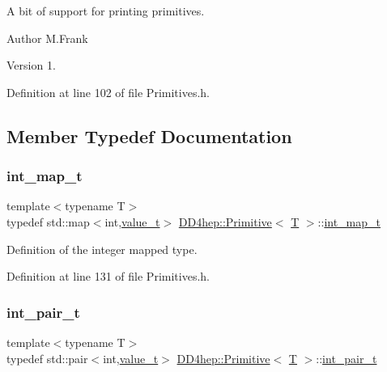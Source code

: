 A bit of support for printing primitives. 

\begin{DoxyAuthor}{Author}
M.\+Frank 
\end{DoxyAuthor}
\begin{DoxyVersion}{Version}
1. 
\end{DoxyVersion}


Definition at line 102 of file Primitives.\+h.



\subsection{Member Typedef Documentation}
\hypertarget{struct_d_d4hep_1_1_primitive_acfd7524785eae3d3470f44b23ce0424f}{}\label{struct_d_d4hep_1_1_primitive_acfd7524785eae3d3470f44b23ce0424f} 
\subsubsection{\texorpdfstring{int\+\_\+map\+\_\+t}{int\_map\_t}}
{\footnotesize\ttfamily template$<$typename T$>$ \\
typedef std\+::map$<$int,\hyperlink{struct_d_d4hep_1_1_primitive_a0639e73bb8f07f99c2d8401f807a7af6}{value\+\_\+t}$>$ \hyperlink{struct_d_d4hep_1_1_primitive}{D\+D4hep\+::\+Primitive}$<$ \hyperlink{class_t}{T} $>$\+::\hyperlink{struct_d_d4hep_1_1_primitive_acfd7524785eae3d3470f44b23ce0424f}{int\+\_\+map\+\_\+t}}



Definition of the integer mapped type. 



Definition at line 131 of file Primitives.\+h.

\hypertarget{struct_d_d4hep_1_1_primitive_a216f9ee1122ffc970b0d419abe76009c}{}\label{struct_d_d4hep_1_1_primitive_a216f9ee1122ffc970b0d419abe76009c} 
\subsubsection{\texorpdfstring{int\+\_\+pair\+\_\+t}{int\_pair\_t}}
{\footnotesize\ttfamily template$<$typename T$>$ \\
typedef std\+::pair$<$int,\hyperlink{struct_d_d4hep_1_1_primitive_a0639e73bb8f07f99c2d8401f807a7af6}{value\+\_\+t}$>$ \hyperlink{struct_d_d4hep_1_1_primitive}{D\+D4hep\+::\+Primitive}$<$ \hyperlink{class_t}{T} $>$\+::\hyperlink{struct_d_d4hep_1_1_primitive_a216f9ee1122ffc970b0d419abe76009c}{int\+\_\+pair\+\_\+t}}



